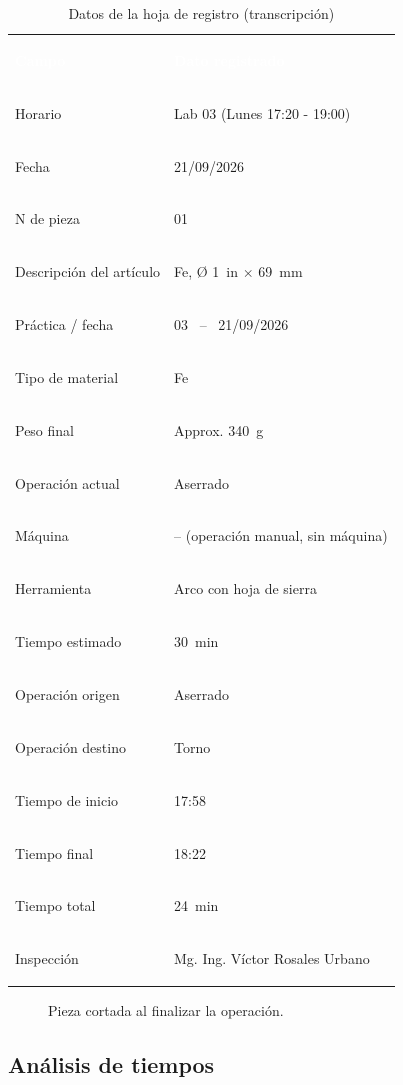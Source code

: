 \documentclass[12pt,a4paper]{article}
\newcommand{\encab}[1]{\textcolor{white}{\sffamily\bfseries #1}}
\begin{document}
\begin{table}[!htb]
	\centering
	\caption{Datos de la hoja de registro (transcripción)}\label{tab:hoja}
	\small
	\begin{tabularx}{\linewidth}{>{\bfseries\raggedright\arraybackslash}p{5.2cm}
			X}
		\rowcolor{darkblue}
		\encab{Campo}            & \encab{Dato
			                           registrado}
		\\
		Horario                  & Lab 03 (Lunes 17:20 - 19:00)
		\\
		Fecha                    & 21/09/2026
		\\
		N\textdegree{} de pieza  & 01
		\\
		Descripción del artículo & Fe, Ø \SI{1}{in} $\times$ \SI{69}{\milli\metre}
		\\
		Práctica / fecha         & 03 \ -- \ 21/09/2026
		\\
		Tipo de material         & Fe
		\\
		Peso final               & Approx. \SI{340}{g}
		\\
		Operación actual         & Aserrado
		\\
		Máquina                  & -- (operación manual, sin máquina)
		\\
		Herramienta              & Arco con hoja de sierra
		\\
		Tiempo estimado          & \SI{30}{\minute}
		\\
		Operación origen         & Aserrado
		\\
		Operación destino        & Torno
		\\
		Tiempo de inicio         & 17:58
		\\
		Tiempo final             & 18:22
		\\
		Tiempo total             & \SI{24}{\minute}
		\\
		Inspección               & Mg. Ing. Víctor Rosales Urbano
		\\
	\end{tabularx}
\end{table}

\begin{figure}[H]
	\centering
	\caption{Pieza cortada al finalizar la operación.}
\end{figure}

\subsection{Análisis de tiempos}
\end{document}
